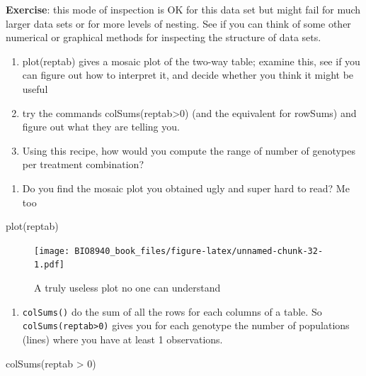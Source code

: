 \documentclass[
  12pt,
]{book}
\makeatletter
\newenvironment{Shaded}{\begin{snugshade}}{\end{snugshade}}
\newcommand{\DecValTok}[1]{\textcolor[rgb]{0.00,0.00,0.81}{#1}}
\newcommand{\FunctionTok}[1]{\textcolor[rgb]{0.00,0.00,0.00}{#1}}
\newcommand{\NormalTok}[1]{#1}
\newcommand{\SpecialCharTok}[1]{\textcolor[rgb]{0.00,0.00,0.00}{#1}}
\providecommand{\tightlist}{%
  \setlength{\itemsep}{0pt}\setlength{\parskip}{0pt}}
\newenvironment{kframe}{%
\medskip{}
\setlength{\fboxsep}{.8em}
\def\at@end@of@kframe{}%
\ifinner\ifhmode%
 \def\at@end@of@kframe{\end{minipage}}%
 \begin{minipage}{\columnwidth}%
\fi\fi%
\def\FrameCommand##1{\hskip\@totalleftmargin \hskip-\fboxsep
\colorbox{incolor}{##1}\hskip-\fboxsep
    \hskip-\linewidth \hskip-\@totalleftmargin \hskip\columnwidth}%
\MakeFramed {\advance\hsize-\width
  \@totalleftmargin\z@ \linewidth\hsize
  \@setminipage}}%
{\par\unskip\endMakeFramed%
\at@end@of@kframe}
\newenvironment{rmdblock}[1]
 {
 \begin{itemize}
 \renewcommand{\labelitemi}{
   \raisebox{-.7\height}[0pt][0pt]{
     {\setkeys{Gin}{width=3em,keepaspectratio}\texttt{[image: images/icons/\#1]}}
   }
 }
 \begin{kframe}
 \setlength{\fboxsep}{1em}
 \item
 }
 {
 \end{kframe}
 \end{itemize}
 }
\newenvironment{rmdcode}
  {\begin{rmdblock}{code}}
  {\end{rmdblock}}
\makeatother
\begin{document}
\begin{rmdcode}
\textbf{Exercise}: this mode of inspection is OK for this data set but might fail for much larger data sets or for more levels of nesting. See if you can think of some other numerical or graphical methods for inspecting the structure of data sets.

\begin{enumerate}
\def\labelenumi{\arabic{enumi}.}
\tightlist
\item
  plot(reptab) gives a mosaic plot of the two-way table; examine this, see if you can figure out how to interpret it, and decide whether you think it might be useful
\item
  try the commands colSums(reptab\textgreater0) (and the equivalent for rowSums) and figure out what they are telling you.
\item
  Using this recipe, how would you compute the range of number of genotypes per treatment combination?
\end{enumerate}
\end{rmdcode}

\begin{enumerate}
\def\labelenumi{\arabic{enumi}.}
\tightlist
\item
  Do you find the mosaic plot you obtained ugly and super hard to read? Me too 🤣
\end{enumerate}

\begin{Shaded}
\begin{Highlighting}[]
\FunctionTok{plot}\NormalTok{(reptab)}
\end{Highlighting}
\end{Shaded}

\begin{figure}
\centering
\texttt{[image: BIO8940\_book\_files/figure-latex/unnamed-chunk-32-1.pdf]}
\caption{\label{fig:unnamed-chunk-32}A truly useless plot no one can understand}
\end{figure}

\begin{enumerate}
\def\labelenumi{\arabic{enumi}.}
\setcounter{enumi}{1}
\tightlist
\item
  \texttt{colSums()} do the sum of all the rows for each columns of a table. So \texttt{colSums(reptab\textgreater{}0)} gives you for each genotype the number of populations (lines) where you have at least 1 observations.
\end{enumerate}

\begin{Shaded}
\begin{Highlighting}[]
\FunctionTok{colSums}\NormalTok{(reptab }\SpecialCharTok{\textgreater{}} \DecValTok{0}\NormalTok{)}
\end{Highlighting}
\end{Shaded}
\end{document}
